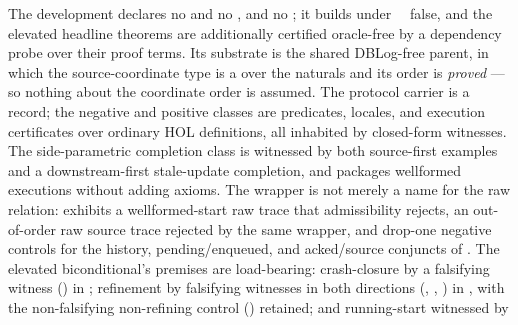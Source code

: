 \documentclass[11pt,a4paper]{article}
\begin{document}
The development declares no  and no , and no
; it builds under
~\isa{=}~false, and the
elevated headline theorems are additionally certified oracle-free by a dependency
probe over their proof terms. Its
  substrate is the shared DBLog-free 
  parent, in which the source-coordinate type is a  over the
  naturals and its order is \emph{proved} --- so nothing about the coordinate
  order is assumed. The
protocol carrier is a record; the negative and positive classes are predicates,
locales, and execution certificates over ordinary HOL definitions, all inhabited
by closed-form witnesses. The side-parametric completion class is witnessed by
both source-first examples and a downstream-first stale-update completion, and
packages wellformed executions without adding axioms. The wrapper is not merely
a name for the raw relation:
exhibits a wellformed-start raw trace that admissibility rejects, an
out-of-order raw source trace rejected by the same wrapper, and drop-one
negative controls for the history, pending/enqueued, and acked/source conjuncts
of . The elevated
biconditional's premises are load-bearing: crash-closure by a falsifying witness
()
in
;
refinement by falsifying witnesses in both directions
(,
,
)
in
,
with the non-falsifying non-refining control
()
retained; and running-start witnessed by
\end{document}
